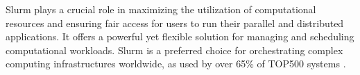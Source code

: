 
Slurm plays a crucial role in maximizing the utilization of computational resources and ensuring fair access for users to run their parallel and distributed applications. It offers a powerful yet flexible solution for managing and scheduling computational workloads. Slurm is a preferred choice for orchestrating complex computing infrastructures worldwide, as used by over 65\% of TOP500 systems \cite{aboutslurm}.



